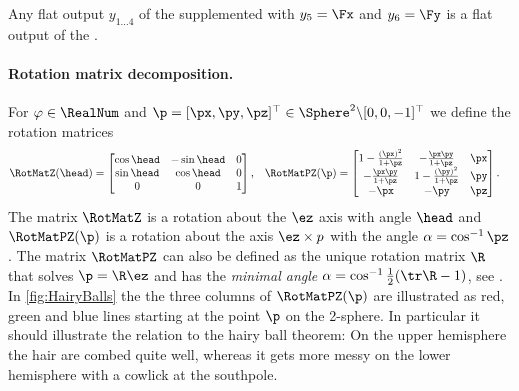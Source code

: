 Any flat output $y_{1\ldots4}$ of the \Quadcopter supplemented with $y_5=\Fx$ and $y_6=\Fy$ is a flat output of the \Tricopter.

\paragraph{Rotation matrix decomposition.}
For $\varphi \in \RealNum$ and $\p = [\px,\py,\pz]^\top \in \Sphere^2 \backslash [0,0,-1]^\top$ we define the rotation matrices
\begin{align}
 \RotMatZ(\head) &=
 \begin{bmatrix}
  \cos\head & -\sin\head & 0 \\
  \sin\head & \cos\head & 0 \\
  0 & 0 & 1
 \end{bmatrix},&
 \RotMatPZ(\p) &=
 \begin{bmatrix}
  1 - \frac{(\px)^2}{1+\pz} & -\frac{\px \py}{1+\pz} & \px \\
  -\frac{\px \py}{1+\pz} & 1 - \frac{(\py)^2}{1+\pz} & \py \\
  -\px & -\py & \pz
 \end{bmatrix}.
\end{align}
The matrix $\RotMatZ$ is a rotation about the $\ez$ axis with angle $\head$ and $\RotMatPZ(\p)$ is a rotation about the axis $\ez \times p$ with the angle $\alpha = \cos^{-1} \pz$.
The matrix $\RotMatPZ$ can also be defined as the unique rotation matrix $\R$ that solves $\p = \R \ez$ and has the \textit{minimal angle} $\alpha = \cos^{-1} \tfrac{1}{2}(\tr \R - 1)$, see \cite{Konz:QuadrotorMovingFrame}.
In \autoref{fig:HairyBalls} the the three columns of $\RotMatPZ(\p)$ are illustrated as red, green and blue lines starting at the point $\p$ on the 2-sphere.
In particular it should illustrate the relation to the hairy ball theorem:
On the upper hemisphere the hair are combed quite well, whereas it gets more messy on the lower hemisphere with a cowlick at the southpole. 

%  


